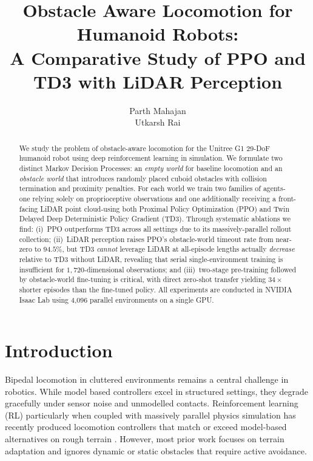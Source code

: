 \documentclass{article}
\title{Obstacle Aware Locomotion for Humanoid Robots:\\
       A Comparative Study of PPO and TD3 with LiDAR Perception}
\author{
  Parth Mahajan\\
  Utkarsh Rai
}
\begin{document}
\maketitle

\begin{abstract}
We study the problem of obstacle-aware locomotion for the Unitree G1 29-DoF
humanoid robot using deep reinforcement learning in simulation.
We formulate two distinct Markov Decision Processes: an \emph{empty world} for
baseline locomotion and an \emph{obstacle world} that introduces randomly
placed cuboid obstacles with collision termination and proximity penalties.
For each world we train two families of agents-one relying solely on
proprioceptive observations and one additionally receiving a front-facing
LiDAR point cloud-using both Proximal Policy Optimization (PPO) and Twin
Delayed Deep Deterministic Policy Gradient (TD3).
Through systematic ablations we find: (i)~PPO outperforms TD3 across all
settings due to its massively-parallel rollout collection; (ii)~LiDAR
perception raises PPO's obstacle-world timeout rate from near-zero to $94.5\%$,
but TD3 \emph{cannot} leverage LiDAR at all-episode lengths actually
\emph{decrease} relative to TD3 without LiDAR, revealing that serial
single-environment training is insufficient for $1{,}720$-dimensional
observations; and (iii)~two-stage pre-training followed by obstacle-world
fine-tuning is critical, with direct zero-shot transfer yielding $34\times$
shorter episodes than the fine-tuned policy.
All experiments are conducted in NVIDIA Isaac Lab using 4{,}096 parallel
environments on a single GPU.
\end{abstract}

\section{Introduction}

Bipedal locomotion in cluttered environments remains a central challenge in
robotics.
While model based controllers excel in structured settings, they degrade
gracefully under sensor noise and unmodelled contacts.
Reinforcement learning (RL) particularly when coupled with massively parallel
physics simulation has recently produced locomotion controllers that match or
exceed model-based alternatives on rough terrain
\cite{lee2020learning,kumar2021rma,margolis2022rapid}.
However, most prior work focuses on terrain adaptation and ignores dynamic or
static obstacles that require active avoidance.
\end{document}
